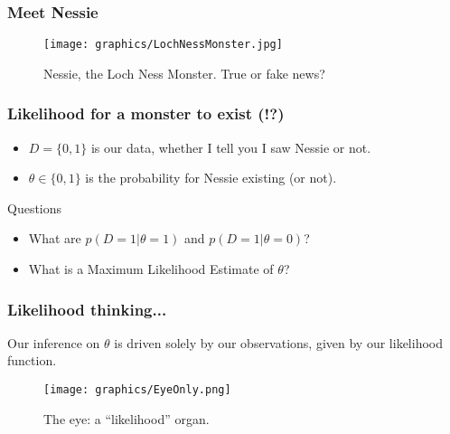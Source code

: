 \documentclass{beamer}
\newcommand{\1}{\ensuremath{\mathbf{1}}}
\begin{document}
%
%
%
\begin{frame}\frametitle{Meet Nessie}
	\begin{figure}
	\begin{center}
		\texttt{[image: graphics/LochNessMonster.jpg]}
	\end{center}
	\caption{Nessie, the Loch Ness Monster. True or fake news?}
	\end{figure}
\end{frame}
%
%
%
\begin{frame}\frametitle{Likelihood for a monster to exist (!?)}
	\begin{itemize}
		\item $D = \{0, 1\}$ is our data, whether I tell you I saw Nessie or not.
		\item $\theta \in \{0, 1\}$ is the probability for Nessie existing (or not).
	\end{itemize}
	\begin{block}{Questions}
		\begin{itemize}
			\item What are $p(D = 1|\theta = 1)$ and $p(D = 1|\theta = 0)$?
			\item What is a Maximum Likelihood Estimate of $\theta$?
		\end{itemize}
	\end{block}
\end{frame}
%
%
%
\begin{frame}\frametitle{Likelihood thinking...}
	Our inference on $\theta$ is driven solely by our observations, given by our likelihood function.
	\begin{figure}
	\begin{center}
		\texttt{[image: graphics/EyeOnly.png]}
	\end{center}
	\caption{The eye: a ``likelihood'' organ.}
	\end{figure}
\end{frame}
\end{document}
